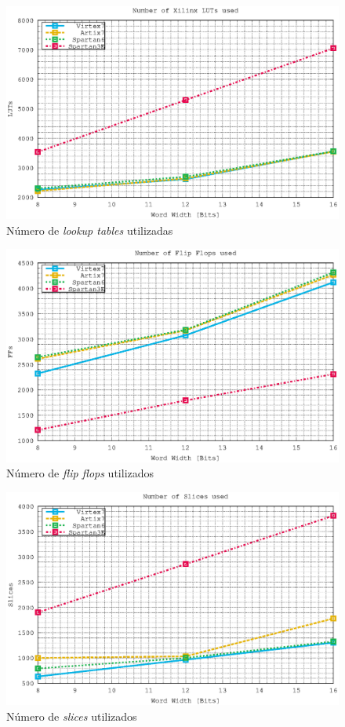 \begin{figure}[htb!]
    \centering
        \includegraphics[width = 11 cm]{./figures/C05-luts}
        \caption{Número de \textit{lookup tables} utilizadas}
        \label{fig:luts}
\end{figure}

\newpage

\begin{figure}[htb!]
    \centering
        \includegraphics[width = 11 cm]{./figures/C05-ffs}
        \caption{Número de \textit{flip flops} utilizados}
        \label{fig:ffs}
\end{figure}

\begin{figure}[htb!]
    \centering
        \includegraphics[width = 11 cm]{./figures/C05-slices}
        \caption{Número de \textit{slices} utilizados}
        \label{fig:slices}
\end{figure}

